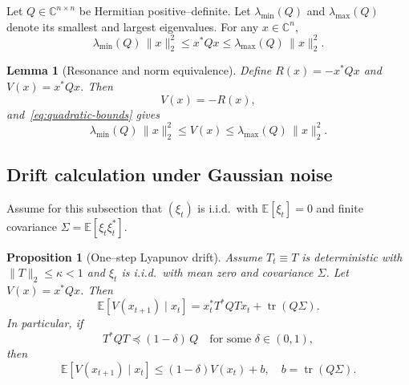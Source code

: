 \documentclass[11pt]{article}
\theoremstyle{plain}
\newtheorem{proposition}[theorem]{Proposition}
\newtheorem{lemma}[theorem]{Lemma}
\theoremstyle{definition}
\numberwithin{equation}{section}
\begin{document}
Let $Q \in \mathbb{C}^{n\times n}$ be Hermitian positive--definite.
Let $\lambda_{\min}(Q)$ and $\lambda_{\max}(Q)$ denote its smallest
and largest eigenvalues. For any $x \in \mathbb{C}^n$,
\begin{equation}
  \lambda_{\min}(Q)\,\|x\|_2^2
  \le x^\ast Q x \le 
  \lambda_{\max}(Q)\,\|x\|_2^2.
  \label{eq:quadratic-bounds}
\end{equation}

\begin{lemma}[Resonance and norm equivalence]
\label{lem:resonance-norm}
Define $R(x) = -x^\ast Q x$ and $V(x) = x^\ast Q x$. Then
\begin{equation}
  V(x) = - R(x),
\end{equation}
and~\eqref{eq:quadratic-bounds} gives
\begin{equation}
  \lambda_{\min}(Q)\,\|x\|_2^2
  \le V(x) \le
  \lambda_{\max}(Q)\,\|x\|_2^2.
\end{equation}
\end{lemma}

\subsection{Drift calculation under Gaussian noise}

Assume for this subsection that $(\xi_t)$ is i.i.d.\ with
$\mathbb{E}[\xi_t] = 0$ and finite covariance
$\Sigma = \mathbb{E}[\xi_t\xi_t^\ast]$.

\begin{proposition}[One--step Lyapunov drift]
\label{prop:gaussian-drift}
Assume $T_t \equiv T$ is deterministic with $\|T\|_2 \le \kappa < 1$
and $\xi_t$ is i.i.d.\ with mean zero and covariance $\Sigma$. Let
$V(x) = x^\ast Q x$. Then
\begin{equation}
  \mathbb{E}[V(x_{t+1}) \mid x_t]
  = x_t^\ast T^\ast Q T x_t + \operatorname{tr}(Q\Sigma).
\end{equation}
In particular, if
\begin{equation}
  T^\ast Q T \preceq (1-\delta)\,Q
  \quad\text{for some } \delta \in (0,1),
  \label{eq:Q-contractive}
\end{equation}
then
\begin{equation}
  \mathbb{E}[V(x_{t+1}) \mid x_t]
  \le (1-\delta) V(x_t) + b,
  \quad b = \operatorname{tr}(Q\Sigma).
  \label{eq:gaussian-drift-ineq}
\end{equation}
\end{proposition}
\end{document}
